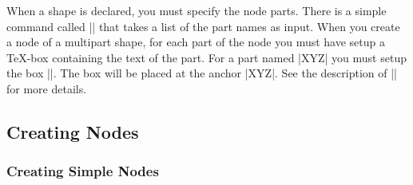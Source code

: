 When a shape is declared, you must specify the node parts. There is a
simple command called |\nodeparts| that takes a list of the part names
as input. When you create a node of a multipart shape, for each part
of the node you must have setup a \TeX-box containing the text of the
part. For a part named |XYZ| you must setup the box
|\pgfnodepartXYZbox|. The box will be placed at the anchor |XYZ|. See
the description of |\pgfmultipartnode| for more details.


\subsection{Creating Nodes}


\subsubsection{Creating Simple Nodes}

